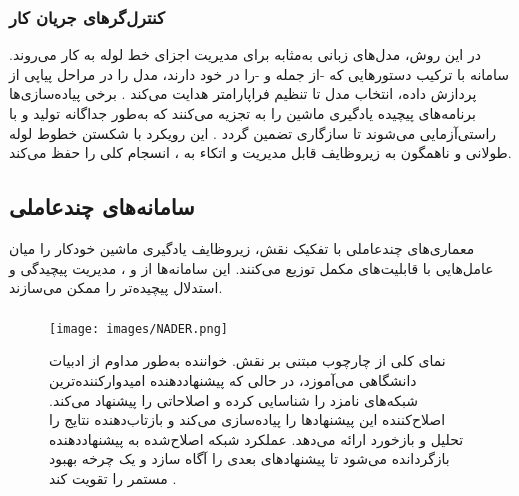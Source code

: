 \subsubsection{کنترل‌گرهای جریان کار}
در این روش، مدل‌های زبانی به‌مثابه  برای مدیریت اجزای خط لوله به کار می‌روند. سامانه با ترکیب دستور‌هایی که -از جمله  و -را در خود دارند، مدل را در مراحل پیاپی از پردازش داده، انتخاب مدل تا تنظیم فراپارامتر هدایت می‌کند \cite{zhang2023AutomlGPTAutomaticMachineLearning, shen2023HuggingGPT}. برخی پیاده‌سازی‌ها برنامه‌های پیچیده یادگیری ماشین را به  تجزیه می‌کنند که به‌طور جداگانه تولید و با  راستی‌آزمایی می‌شوند تا سازگاری تضمین گردد \cite{xu2024largeTextToML}. این رویکرد با شکستن خطوط لوله طولانی و ناهمگون به زیروظایف قابل مدیریت و اتکاء به ، انسجام کلی را حفظ می‌کند.
\subsection{سامانه‌های چندعاملی}

معماری‌های چندعاملی با تفکیک نقش، زیروظایف یادگیری ماشین خودکار را میان عامل‌هایی با قابلیت‌های مکمل توزیع می‌کنند. این سامانه‌ها از  و ، مدیریت پیچیدگی و استدلال پیچیده‌تر را ممکن می‌سازند.

\subsubsection{\protect{}}

\begin{figure}[h!]
    \centering
    \texttt{[image: images/NADER.png]}
    \caption[چارچوب مبتنی بر نقش]{
        نمای کلی از چارچوب مبتنی بر نقش. خواننده به‌طور مداوم از ادبیات دانشگاهی می‌آموزد، در حالی که پیشنهاددهنده امیدوارکننده‌ترین شبکه‌های نامزد را شناسایی کرده و اصلاحاتی را پیشنهاد می‌کند. اصلاح‌کننده این پیشنهادها را پیاده‌سازی می‌کند و بازتاب‌دهنده نتایج را تحلیل و بازخورد ارائه می‌دهد. عملکرد شبکه اصلاح‌شده به پیشنهاددهنده بازگردانده می‌شود تا پیشنهادهای بعدی را آگاه سازد و یک چرخه بهبود مستمر را تقویت کند \cite{Yang2025NADER}.
    }
    \label{fig:role-based-framework}
\end{figure}

